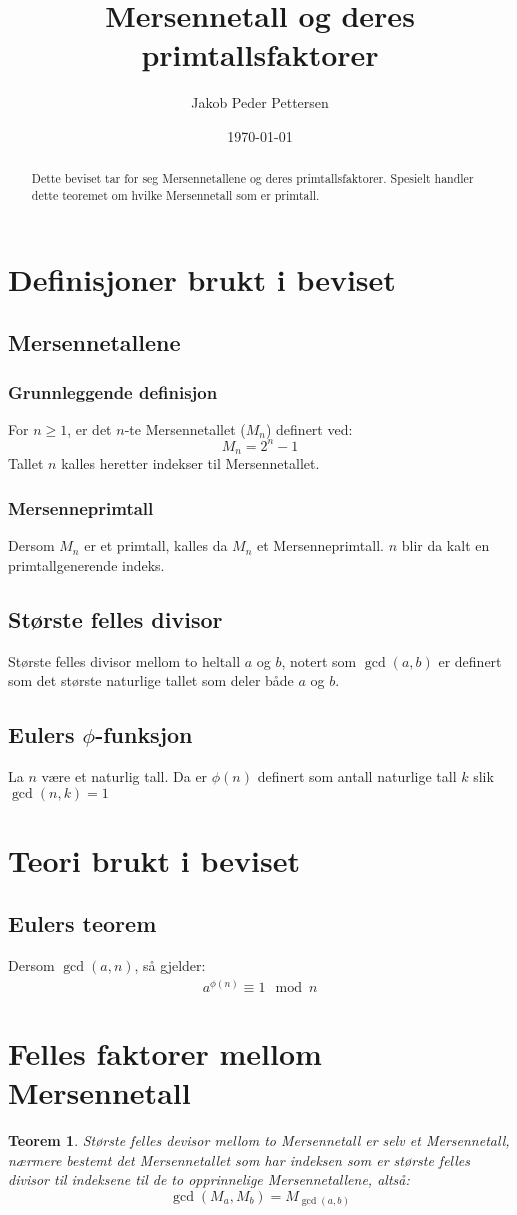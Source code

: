\documentclass[a4paper,twoside]{article}
\title{Mersennetall og deres primtallsfaktorer}
\author{Jakob Peder Pettersen}
\date{\today}
\theoremstyle{plain}
\newtheorem{thm}{Teorem}[section]
\begin{document}
\maketitle
\begin{abstract}
Dette beviset tar for seg Mersennetallene og deres primtallsfaktorer. Spesielt handler dette teoremet om hvilke Mersennetall som er primtall.
\end{abstract}
\tableofcontents \newpage
\section{Definisjoner brukt i beviset}
\subsection{Mersennetallene}
\subsubsection{Grunnleggende definisjon}
For $n\geq 1$, er det $n$-te Mersennetallet ($M_n$) definert ved:
\[
M_n=2^{n}-1
\]
Tallet $n$ kalles heretter indekser til Mersennetallet.
\subsubsection{Mersenneprimtall}
Dersom $M_n$ er et primtall, kalles da $M_n$ et Mersenneprimtall. $n$ blir da kalt en primtallgenerende indeks.
\subsection{Største felles divisor}
Største felles divisor mellom to heltall $a$ og $b$, notert som $\gcd\left(a,b\right)$ er definert som det største naturlige tallet som deler både $a$ og $b$.
\subsection{Eulers $\phi$-funksjon}
La $n$ være et naturlig tall. Da er $\phi(n)$ definert som antall naturlige tall $k$ slik $\gcd(n,k)=1$
\section{Teori brukt i beviset}
\subsection{Eulers teorem}
Dersom $\gcd(a,n)$, så gjelder:
\begin{align}
	a^{\phi(n)} \equiv 1 \mod n
\end{align}
\section{Felles faktorer mellom Mersennetall}
\begin{thm}
	Største felles devisor mellom to Mersennetall er selv et Mersennetall, nærmere bestemt det Mersennetallet som har indeksen som er største felles divisor til indeksene til de to opprinnelige  Mersennetallene, altså:\[\gcd\left(M_a,M_b\right)=M_{\gcd(a,b)} \]
\end{thm}
\end{document}
